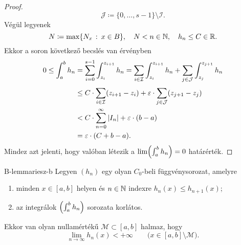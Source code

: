 \documentclass[
]{elteikthesis}[2024/04/26]
\begin{document}
\begin{proof}
\[			\mathcal{J} \coloneq
			\{ 0, \dots, s-1 \} \setminus \mathcal{I}.
		\]
		Végül legyenek
		\[
			N \coloneq \max \{ N_x \ \colon \, x \in B \}, \quad
			N < n \in \N, \quad
			h_n \leq C \in \R.
		\]
		Ekkor a soron következő becslés van érvényben
		\begin{align*}
			0 \leq \int_a^b h_n
			&= \sum_{i=0}^{s-1} \int_{z_i}^{z_{i+1}} h_n 
			 = \sum_{i \in \mathcal{I}} \int_{z_i}^{z_{i+1}} h_n 
			 + \sum_{j \in \mathcal{J}} \int_{z_j}^{z_{j+1}} h_n \\[3pt]
			&\leq C \cdot \sum_{i \in \mathcal{I}} (z_{i + 1} - z_i)
			+ \varepsilon \cdot \sum_{j \in \mathcal{J}} (z_{j + 1} - z_j) \\
			&< C \cdot \sum_{n=0}^{\infty} \abs{I_n}
			+ \varepsilon \cdot (b - a) \\
			&= \varepsilon \cdot (C + b - a).
		\end{align*}
		Mindez azt jelenti, hogy valóban létezik 
		a \( \lim \Bigl( \int_a^b h_n \Bigr) = 0 \) határérték.
	\end{proof}
	
	\begin{lemma}{B-lemma}{riesz-b}
		Legyen \( (h_n) \) egy olyan \( C_0 \)-beli függvénysorozat, amelyre
		\begin{enumerate}[label=\roman*)]
			\item
			minden \( x \in [a, b] \) helyen és \( n \in \mathbb{N} \) indexre
			\( h_n(x) \leq h_{n + 1}(x) \);
			
			\item
			az integrálok \( \Bigl( \int_a^b h_n \Bigr) \) sorozata korlátos.
		\end{enumerate}
		Ekkor van olyan nullamértékű \( \mathcal{M} \subset [a, b] \) halmaz, hogy
		\[
			\lim_{n \to \infty} h_n(x) < +\infty
			\qquad \bigl( x \in [a, b] \setminus \mathcal{M} \bigr).
		\]
	\end{lemma}
	
%		
\end{document}

